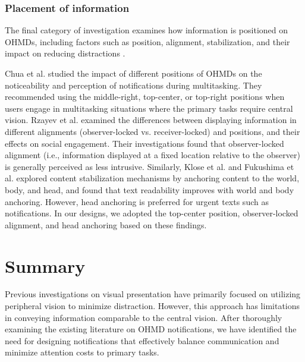 \subsubsection*{Placement of information} 
\label{sec:Relatedwork:ohmd_notification:placement}

The final category of investigation examines how information is positioned on OHMDs, including factors such as position, alignment, stabilization, and their impact on reducing distractions \cite{chua_positioning_2016, rzayev_effects_2020, klose_text_2019, fukushima_comparing_2020, lauber_your_face_2014}.

Chua et al. \cite{chua_positioning_2016} studied the impact of different positions of OHMDs on the noticeability and perception of notifications during multitasking. They recommended using the middle-right, top-center, or top-right positions when users engage in multitasking situations where the primary tasks require central vision.
Rzayev et al. \cite{rzayev_effects_2020} examined the differences between displaying information in different alignments (observer-locked vs. receiver-locked) and positions, and their effects on social engagement. Their investigations found that observer-locked alignment (i.e., information displayed at a fixed location relative to the observer) is generally perceived as less intrusive.
Similarly, Klose et al. \cite{klose_text_2019} and Fukushima et al. \cite{fukushima_comparing_2020} explored content stabilization mechanisms by anchoring content to the world, body, and head, and found that text readability improves with world and body anchoring. However, head anchoring is preferred for urgent texts such as notifications. 
In our designs, we adopted the top-center position, observer-locked alignment, and head anchoring based on these findings.


\section{Summary}
\label{sec:Relatedwork:summary}

Previous investigations on visual presentation have primarily focused on utilizing peripheral vision to minimize distraction. However, this approach has limitations in conveying information comparable to the central vision. After thoroughly examining the existing literature on OHMD notifications, we have identified the need for designing notifications that effectively balance communication and minimize attention costs to primary tasks.

